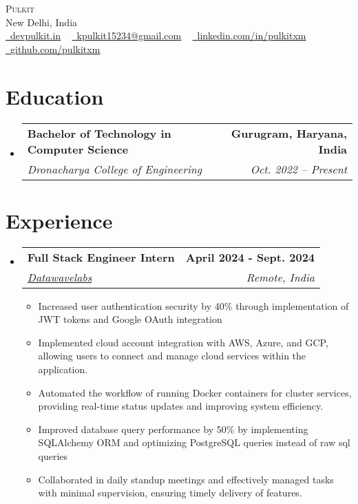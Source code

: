 \documentclass[letterpaper,11pt]{article}
\makeatletter
\newcommand{\resumeItem}[1]{
  \item{
    {#1 \vspace{-2pt}}
  }
}
\newcommand{\resumeSubheading}[4]{
  \vspace{-2pt}\item
    \begin{tabular*}{1.0\textwidth}[t]{l@{\extracolsep{\fill}}r}
      \textbf{#1} & \textbf{ #2} \\
      \textit{#3} & \textit{ #4} \\
    \end{tabular*}\vspace{-7pt}
}
\newcommand{\resumeSubHeadingListStart}{\begin{itemize}[leftmargin=0.0in, label={}]}
\newcommand{\resumeSubHeadingListEnd}{\end{itemize}}
\newcommand{\resumeItemListStart}{\begin{itemize}}
\newcommand{\resumeItemListEnd}{\end{itemize}\vspace{-5pt}}
\makeatother
\begin{document}
\begin{center}
    {\Huge \scshape Pulkit} \\ \vspace{3pt}
    New Delhi, India \\ \vspace{3pt}
    \small 
    \href{https://www.devpulkit.in/}{\raisebox{-0.2\height}\faLink\ \underline{devpulkit.in}} ~
    \href{mailto:kpulkit15234@gmail.com}{\raisebox{-0.2\height}\faEnvelope\ \underline{kpulkit15234@gmail.com}} ~
    \href{https://www.linkedin.com/in/pulkitxm}{\raisebox{-0.2\height}\faLinkedin\ \underline{linkedin.com/in/pulkitxm}} ~
    \href{https://github.com/Pulkitxm}{\raisebox{-0.2\height}\faGithub\ \underline{github.com/pulkitxm}}
    \vspace{-8pt}
\end{center}

\section{Education}
\resumeSubHeadingListStart%
\resumeSubheading%
{Bachelor of Technology in Computer Science}{Gurugram, Haryana, India}
{Dronacharya College of Engineering}{Oct. 2022 – Present}
\resumeSubHeadingListEnd%

\section{Experience}
\resumeSubHeadingListStart%
\resumeSubheading%
{Full Stack Engineer Intern}{April 2024 - Sept. 2024}
{\href{https://www.datawavelabs.io/}{Datawavelabs}}{Remote, India}
\resumeItemListStart%
\resumeItem{Increased user authentication security by 40\% through implementation of JWT tokens and Google OAuth integration}
\resumeItem{Implemented cloud account integration with AWS, Azure, and GCP, allowing users to connect and manage cloud services within the application.}
\resumeItem{Automated the workflow of running Docker containers for cluster services, providing real-time status updates and improving system efficiency.}
\resumeItem{Improved database query performance by 50\% by implementing SQLAlchemy ORM and optimizing PostgreSQL queries instead of raw sql queries}
\resumeItem{Collaborated in daily standup meetings and effectively managed tasks with minimal supervision, ensuring timely delivery of features.}
\resumeItemListEnd%
\resumeSubHeadingListEnd%
\vspace{-14pt}
\end{document}
